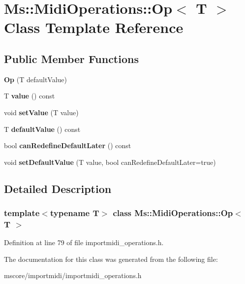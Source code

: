 \hypertarget{class_ms_1_1_midi_operations_1_1_op}{}\section{Ms\+:\+:Midi\+Operations\+:\+:Op$<$ T $>$ Class Template Reference}
\label{class_ms_1_1_midi_operations_1_1_op}
\subsection*{Public Member Functions}
\begin{DoxyCompactItemize}
\item 
\mbox{\label{class_ms_1_1_midi_operations_1_1_op_a6b7188713d2da5bc8673434260d0bffa}} 
{\bfseries Op} (T default\+Value)
\item 
\mbox{\label{class_ms_1_1_midi_operations_1_1_op_a9e7bb8e4dfe7cc99a3b5381a32eae7ce}} 
T {\bfseries value} () const
\item 
\mbox{\label{class_ms_1_1_midi_operations_1_1_op_aa51c7d358581e78855d8d537ecebd8eb}} 
void {\bfseries set\+Value} (T value)
\item 
\mbox{\label{class_ms_1_1_midi_operations_1_1_op_af501625782e257f919f28176fcfc1dd0}} 
T {\bfseries default\+Value} () const
\item 
\mbox{\label{class_ms_1_1_midi_operations_1_1_op_a764eb309ae5c9363783505691d2f192b}} 
bool {\bfseries can\+Redefine\+Default\+Later} () const
\item 
\mbox{\label{class_ms_1_1_midi_operations_1_1_op_ac8df173e89b32255119c7a2e2838c8af}} 
void {\bfseries set\+Default\+Value} (T value, bool can\+Redefine\+Default\+Later=true)
\end{DoxyCompactItemize}


\subsection{Detailed Description}
\subsubsection*{template$<$typename T$>$\newline
class Ms\+::\+Midi\+Operations\+::\+Op$<$ T $>$}



Definition at line 79 of file importmidi\+\_\+operations.\+h.



The documentation for this class was generated from the following file\+:\begin{DoxyCompactItemize}
\item 
mscore/importmidi/importmidi\+\_\+operations.\+h\end{DoxyCompactItemize}
